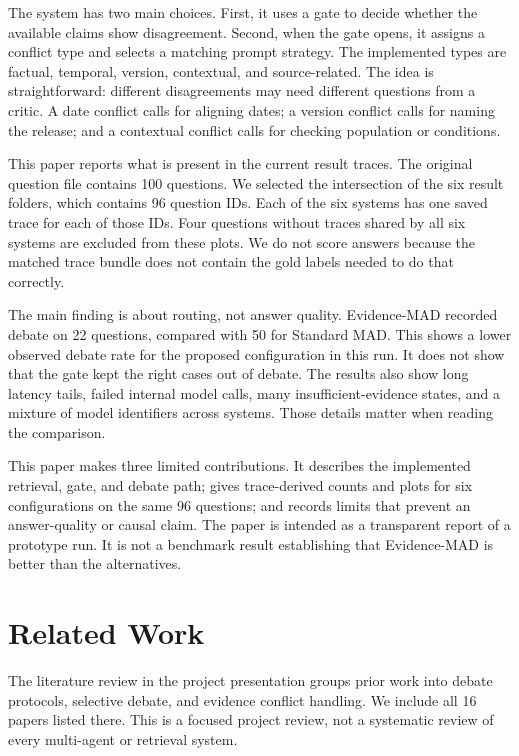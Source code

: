 \documentclass[conference]{IEEEtran}
\begin{document}
The system has two main choices. First, it uses a gate to decide whether the available claims show disagreement. Second, when the gate opens, it assigns a conflict type and selects a matching prompt strategy. The implemented types are factual, temporal, version, contextual, and source-related. The idea is straightforward: different disagreements may need different questions from a critic. A date conflict calls for aligning dates; a version conflict calls for naming the release; and a contextual conflict calls for checking population or conditions.

This paper reports what is present in the current result traces. The original question file contains 100 questions. We selected the intersection of the six result folders, which contains 96 question IDs. Each of the six systems has one saved trace for each of those IDs. Four questions without traces shared by all six systems are excluded from these plots. We do not score answers because the matched trace bundle does not contain the gold labels needed to do that correctly.

The main finding is about routing, not answer quality. Evidence-MAD recorded debate on 22 questions, compared with 50 for Standard MAD. This shows a lower observed debate rate for the proposed configuration in this run. It does not show that the gate kept the right cases out of debate. The results also show long latency tails, failed internal model calls, many insufficient-evidence states, and a mixture of model identifiers across systems. Those details matter when reading the comparison.

This paper makes three limited contributions. It describes the implemented retrieval, gate, and debate path; gives trace-derived counts and plots for six configurations on the same 96 questions; and records limits that prevent an answer-quality or causal claim. The paper is intended as a transparent report of a prototype run. It is not a benchmark result establishing that Evidence-MAD is better than the alternatives.

\section{Related Work}
The literature review in the project presentation groups prior work into debate protocols, selective debate, and evidence conflict handling. We include all 16 papers listed there. This is a focused project review, not a systematic review of every multi-agent or retrieval system.
\end{document}
